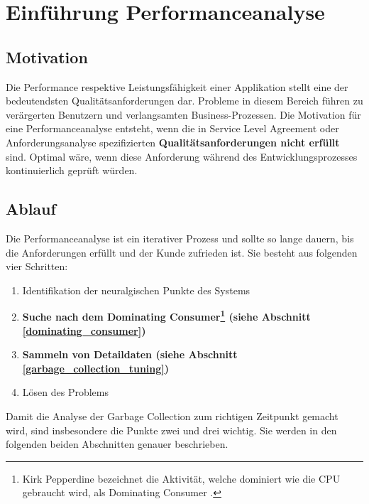 \chapter{Einführung Performanceanalyse}
\section{Motivation}

Die Performance respektive Leistungsfähigkeit einer Applikation stellt eine der bedeutendsten Qualitätsanforderungen dar. Probleme in diesem Bereich führen zu verärgerten Benutzern und verlangsamten Business-Prozessen. Die Motivation für eine Performanceanalyse entsteht, wenn die in Service Level Agreement oder Anforderungsanalyse spezifizierten \textbf{Qualitätsanforderungen nicht erfüllt} sind. Optimal wäre, wenn diese Anforderung während des Entwicklungsprozesses kontinuierlich geprüft würden.

\section{Ablauf}
Die Performanceanalyse ist ein iterativer Prozess und sollte so lange dauern, bis die Anforderungen erfüllt und der Kunde zufrieden ist. Sie besteht aus folgenden vier Schritten\cite{hummelBeer201109}:
\begin{enumerate}
	\item Identifikation der neuralgischen Punkte des Systems
	\item \textbf{Suche nach dem Dominating Consumer\footnote{Kirk Pepperdine bezeichnet die Aktivität, welche dominiert wie die CPU gebraucht wird, als Dominating Consumer . } (siehe Abschnitt \ref{dominating_consumer})}
	\item \textbf{Sammeln von Detaildaten (siehe Abschnitt \ref{garbage_collection_tuning})}
	\item Lösen des Problems
\end{enumerate}


Damit die Analyse der Garbage Collection zum richtigen Zeitpunkt gemacht wird, sind insbesondere die Punkte zwei und drei wichtig. Sie werden in den folgenden beiden Abschnitten genauer beschrieben.
